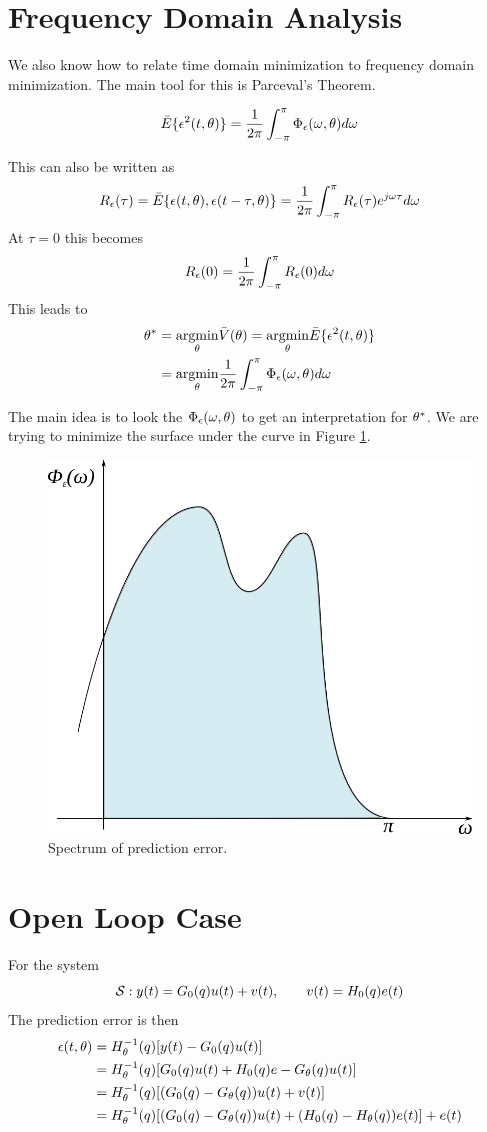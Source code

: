 \section{Frequency Domain Analysis}
We also know how to relate time domain minimization to frequency domain minimization. The main tool for this is Parceval's Theorem.
\begin{theorem}
$$\bar{E}\{\epsilon^2(t,\theta)\} = \frac{1}{2\pi}\int_{-\pi}^\pi \Phi_\epsilon(\omega,\theta)d\omega$$
\end{theorem}
This can also be written as
$$R_\epsilon(\tau) = \bar{E}\{\epsilon(t,\theta),\epsilon(t-\tau,\theta)\} = \frac{1}{2\pi}\int_{-\pi}^\pi R_\epsilon(\tau)e^{j\omega\tau}d\omega$$
At $\tau=0$ this becomes
$$R_\epsilon(0) = \frac{1}{2\pi}\int_{-\pi}^\pi R_\epsilon(0)d\omega$$
This leads to
\begin{align*}
\theta^\ast &= \underset{\theta}{\operatorname{argmin}}\bar{V}(\theta) = \underset{\theta}{\operatorname{argmin}}\bar{E}\{\epsilon^2(t,\theta)\} \\
&= \underset{\theta}{\operatorname{argmin}}\frac{1}{2\pi}\int_{-\pi}^\pi \Phi_\epsilon(\omega,\theta)d\omega
\end{align*}

The main idea is to look the $\Phi_\epsilon(\omega,\theta)$ to get an interpretation for $\theta^\ast$. We are trying to minimize the surface under the curve in Figure \ref{fig:16spec}.

\begin{figure}[ht!]
	\centering
	\includegraphics[width=.3\textwidth]{images/16spec}
	\caption{Spectrum of prediction error.}
	\label{fig:16spec}
\end{figure}

\section{Open Loop Case}
For the system
$$\mathcal{S}: y(t) = G_0(q) u(t) + v(t), \qquad v(t) = H_0(q) e(t)$$
The prediction error is then
\begin{align}
\epsilon(t,\theta) &= H_\theta^{-1}(q)[y(t)-G_0(q) u(t)] \nonumber \\
&= H_\theta^{-1}(q)[G_0(q) u(t)+H_0(q) e-G_\theta(q) u(t)] \nonumber \\
\label{eq:16e1}
&= H_\theta^{-1}(q)[(G_0(q)-G_\theta(q))u(t)+v(t)] \\
\label{eq:16e2}
&= H_\theta^{-1}(q) [ (G_0(q) - G_\theta(q)) u(t) + (H_0(q) - H_\theta(q)) e(t) ] + e(t)
\end{align}

